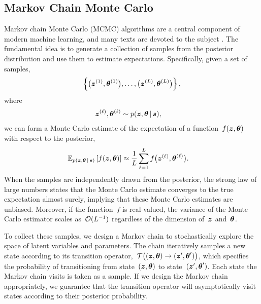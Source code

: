 \subsection{Markov Chain Monte Carlo}
Markov chain Monte Carlo (MCMC) algorithms are a central component of modern
machine learning, and many texts are devoted to the subject
\citep[e.g.][]{geyer1992practical, gilks2005markov, robert2013monte}.
The fundamental idea is to generate a collection of samples from the
posterior distribution and use them to estimate expectations.
Specifically, given a set of samples,
\begin{align*}
  \left \{ \big(\boldsymbol{z}^{(1)}, \boldsymbol{\theta}^{(1)} \big), 
           \ldots, 
           \big(\boldsymbol{z}^{(L)}, \boldsymbol{\theta}^{(L)} \big) 
  \right\},
\end{align*}
where
\begin{align*}
  \boldsymbol{z}^{(\ell)}, \boldsymbol{\theta}^{(\ell)} &\sim p(\boldsymbol{z}, \boldsymbol{\theta} \,|\, \boldsymbol{s}),
\end{align*}
we can form a Monte Carlo estimate of the expectation of a function~$f(\boldsymbol{z}, \boldsymbol{\theta})$
with respect to the posterior,
\begin{align*}
  \mathbb{E}_{p(\boldsymbol{z}, \boldsymbol{\theta} \,|\, \boldsymbol{s})} \left[ f(\boldsymbol{z}, \boldsymbol{\theta}) \right] 
  &\approx \frac{1}{L} \sum_{\ell = 1}^L f \big(\boldsymbol{z}^{(\ell)}, \boldsymbol{\theta}^{(\ell)} \big).
\end{align*}
When the samples are independently drawn from the posterior, the strong 
law of large numbers states that the Monte Carlo estimate converges to 
the true expectation almost surely, implying that these Monte Carlo
estimates are unbiased. Moreover, if the function~$f$ is real-valued, 
the variance of the Monte Carlo estimator scales as~$\mathcal{O}(L^{-1})$
regardless of the dimension of~$\boldsymbol{z}$ and~$\boldsymbol{\theta}$.


To collect these samples, we design a Markov chain to stochastically
explore the space of latent variables and parameters.  
The chain iteratively samples a new state according to its transition
operator,~${\mathcal{T} \big((\boldsymbol{z}, \boldsymbol{\theta}) \to (\boldsymbol{z}', \boldsymbol{\theta}') \big)}$,
which specifies the probability of transitioning from state~${(\boldsymbol{z},
  \boldsymbol{\theta})}$ to state~${(\boldsymbol{z}', \boldsymbol{\theta}')}$.  Each state the Markov
chain visits is taken as a sample. If we design the Markov chain
appropriately, we guarantee that the transition operator will
asymptotically visit states according to their posterior probability.


